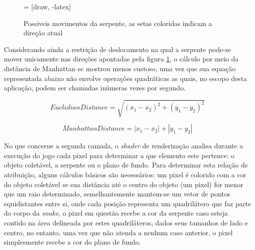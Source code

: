 \documentclass[conference]{IEEEtran}
\begin{document}
\begin{figure}[H]
\centering
{} = [draw, -latex]

\caption{Possíveis movimentos da serpente, as setas coloridas indicam a direção atual}
\label{fig:snakeHeadPositions}
\end{figure}

Considerando ainda a restrição de deslocamento na qual a serpente pode-se mover unicamente nas direções apontadas pela figura \ref{fig:snakeHeadPositions}, o cálculo por meio da distância de Manhattan se mostrou menos custoso, uma vez que sua equação representada abaixo não envolve operações quadráticas as quais, no escopo desta aplicação, podem ser chamadas inúmeras vezes por segundo.

\begin{equation}
EuclidianDistance = \sqrt{(x_{1} - x_{2})^2 + (y_{1} - y_{2})^2}
\label{equation:euclidian}
\end{equation}

\begin{equation}
ManhattanDistance = \left|x_{1} - x_{2}\right| + \left|y_{1} - y_{2}\right|
\label{equation:manhattan}
\end{equation}

No que concerne a segunda camada, o \textit{shader} de renderização analisa durante a execução do jogo cada pixel para determinar a que elemento este pertence: o objeto coletável, a serpente ou o plano de fundo. Para determinar esta relação de atribuição, alguns cálculos básicos são necessários: um pixel é colorido com a cor do objeto coletável se sua distância até o centro do objeto (um pixel) for menor que um raio determinado, semelhantemente mantem-se um vetor de pontos equidistantes entre si, onde cada posição representa um quadrilátero que faz parte do corpo da \textit{snake}, o pixel em questão recebe a cor da serpente caso esteja contido na área delineada por estes quadriláteros, dados seus tamanhos de lado e centro, no entanto, uma vez que não atenda a nenhum caso anterior, o pixel simplesmente recebe a cor do plano de fundo.
\end{document}
